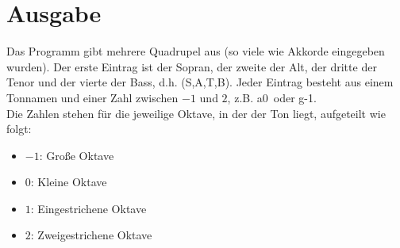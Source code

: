 \documentclass[11.5pt,a4paper]{article}
\begin{document}
\section{Ausgabe}
Das Programm gibt mehrere Quadrupel aus (so viele wie Akkorde eingegeben wurden). Der erste Eintrag ist der Sopran, der zweite der Alt, der dritte der Tenor und der vierte der Bass, d.h. (S,A,T,B). Jeder Eintrag besteht aus einem Tonnamen und einer Zahl zwischen $-1$ und $2$, z.B. \glqq a0\grqq \ oder \glqq g-1\grqq. \\
Die Zahlen stehen für die jeweilige Oktave, in der der Ton liegt, aufgeteilt wie folgt:

\begin{itemize}
	\item $-1$: Große Oktave
	\item $0$: Kleine Oktave
	\item $1$: Eingestrichene Oktave
	\item $2$: Zweigestrichene Oktave
\end{itemize}

	
\end{document}
